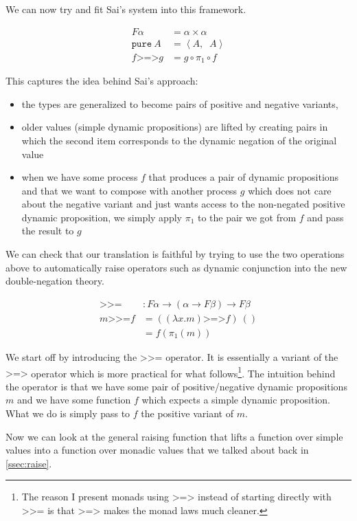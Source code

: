 \documentclass[a4paper,11pt,DIV=12]{scrartcl}
\newcommand{\dnot}{\mathop{\overline{\lnot}}}
\newcommand{\hsbind}{\mathbin{\texttt{>>=}}}
\newcommand{\hscomp}{\mathbin{\texttt{>=>}}}
\begin{document}
We can now try and fit Sai's system into this framework.

\begin{align*}
  F \alpha &= \alpha \times \alpha \\
  \texttt{pure}\ A &= \left< A, \dnot A \right> \\
  f \hscomp g &= g \circ \pi_1 \circ f
\end{align*}

This captures the idea behind Sai's approach:

\begin{itemize}
\item the types are generalized to become pairs of positive and negative
  variants,
\item older values (simple dynamic propositions) are lifted by creating
  pairs in which the second item corresponds to the dynamic negation of the
  original value
\item when we have some process $f$ that produces a pair of dynamic
  propositions and that we want to compose with another process $g$ which
  does not care about the negative variant and just wants access to the
  non-negated positive dynamic proposition, we simply apply $\pi_1$ to the
  pair we got from $f$ and pass the result to $g$
\end{itemize}

We can check that our translation is faithful by trying to use the two
operations above to automatically raise operators such as dynamic
conjunction into the new double-negation theory.

\begin{align*}
  \hsbind &: F \alpha \to (\alpha \to F \beta) \to F \beta \\
  m \hsbind f &= ((\lambda x. m) \hscomp f)\ () \\
              &= f (\pi_1(m))
\end{align*}

We start off by introducing the $\hsbind$ operator. It is essentially a
variant of the $\hscomp$ operator which is more practical for what
follows\footnote{The reason I present monads using $\hscomp$ instead of
  starting directly with $\hsbind$ is that $\hscomp$ makes the monad laws
  much cleaner.}. The intuition behind the operator is that we have some
pair of positive/negative dynamic propositions $m$ and we have some
function $f$ which expects a simple dynamic proposition. What we do is
simply pass to $f$ the positive variant of $m$.

Now we can look at the general raising function that lifts a function over
simple values into a function over monadic values that we talked about back
in \ref{ssec:raise}.
\end{document}
